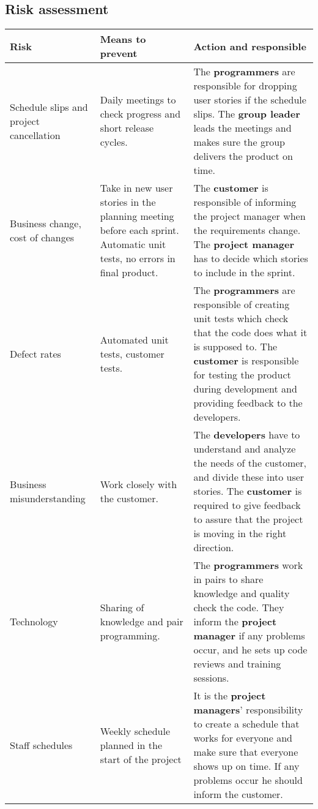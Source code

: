 \subsection{Risk assessment}
\begin{adjustbox}{center}
\begin{tabular}{ p{0.1\paperwidth} | p{0.25\paperwidth} | p{0.3\paperwidth} }
    Risk & Means to prevent & Action and responsible \\ \hline
    Schedule slips and project cancellation
    & Daily meetings to check progress and short release cycles.
    & The \textbf{programmers} are responsible for dropping user stories if the schedule slips. The \textbf{group leader} leads the meetings and makes sure the group delivers the product on time. \\ \hline
    Business change, cost of changes
    & Take in new user stories in the planning meeting before each sprint. Automatic unit tests, no errors in final product.
    & The \textbf{customer} is responsible of informing the project manager when the requirements change. The \textbf{project manager} has to decide which stories to include in the sprint. \\ \hline
    Defect rates
    & Automated unit tests, customer tests.
    & The \textbf{programmers} are responsible of creating unit tests which check that the code does what it is supposed to. The \textbf{customer} is responsible for testing the product during development and providing feedback to the developers. \\ \hline
    Business misunderstanding
    & Work closely with the customer.
    & The \textbf{developers} have to understand and analyze the needs of the customer, and divide these into user stories. The \textbf{customer} is required to give feedback to assure that the project is moving in the right direction. \\ \hline
    Technology
    & Sharing of knowledge and pair programming. 
    & The \textbf{programmers} work in pairs to share knowledge and quality check the code. They inform the \textbf{project manager} if any problems occur, and he sets up code reviews and training sessions. \\ \hline
    Staff schedules
    & Weekly schedule planned in the start of the project
    & It is the \textbf{project managers}' responsibility to create a schedule that works for everyone and make sure that everyone shows up on time. If any problems occur he should inform the customer. \\ \hline
\end{tabular}
\end{adjustbox}
